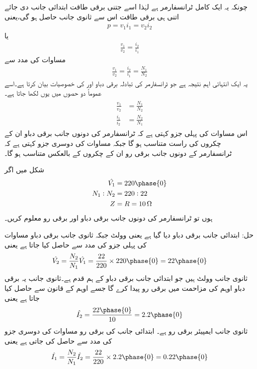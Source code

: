 چونکہ یہ ایک کامل ٹرانسفارمر ہے لہٰذا اسے جتنی برقی طاقت ابتدائی جانب  دی جائے اتنی ہی برقی طاقت اس سے ثانوی جانب حاصل ہو گی،یعنی
\begin{align}
p=v_1 i_1 = v_2 i_2
\end{align}
یا
\begin{align}
\frac{v_1}{v_2}=\frac{i_2}{i_1}
\end{align}
مساوات   کی مدد سے
\begin{align}
\frac{v_1}{v_2}=\frac{i_2}{i_1}=\frac{N_1}{N_2}
\end{align}
یہ ایک انتہائی اہم نتیجہ ہے جو ٹرانسفارمر کی تبادلہ برقی دباو اور   کی خصوصیات بیان کرتا ہے۔اسے عموماً دو حصوں میں یوں لکھا جاتا ہے۔
\begin{gather}
\begin{aligned}\label{مساوات_ٹرانسفارمر_تبادلہ_دباو_رو}
\frac{v_1}{v_2}&=\frac{N_1}{N_2}\\
\frac{i_1}{i_2}&=\frac{N_2}{N_1}
\end{aligned}
\end{gather}
اس مساوات کی پہلی جزو کہتی ہے کہ ٹرانسفارمر کی دونوں جانب برقی دباو  ان کے چکروں کی راست متناسب  ہو گا جبکہ مساوات کی دوسری جزو کہتی ہے کہ ٹرانسفارمر کے دونوں جانب برقی رو ان کے چکروں کے بالعکس متناسب ہو گا۔

	شکل    میں اگر
\begin{align*}
\hat{V_1}&=220 \phase{0}\\
N_1:N_2&=220:22\\
Z&=R=\SI{10}{\ohm}
\end{align*}
ہوں تو ٹرانسفارمر کی دونوں جانب برقی دباو اور برقی رو معلوم کریں۔

حل:
ابتدائی جانب برقی دباو دیا گیا ہے یعنی  وولٹ جبکہ ثانوی جانب برقی دباو مساوات  کی پہلی جزو کی مدد سے حاصل کیا جاتا ہے یعنی
\begin{align*}
\hat{V_2}=\frac{N_2}{N_1} \hat{V_1}=\frac{22}{220} \times 220\phase {0}=22\phase{0}
\end{align*}
ثانوی جانب  وولٹ ہیں جو ابتدائی جانب برقی دباو کے ہم قدم ہے۔ثانوی جانب یہ برقی دباو  اوہم کی مزاحمت میں برقی رو پیدا کرے گا جسے اوہم کے قانون سے حاصل کیا جاتا ہے یعنی
\begin{align*}
\hat{I_2}=\frac{22 \phase {0}}{10}=2.2\phase {0}
\end{align*}
ثانوی جانب  ایمپیئر برقی رو ہے۔ ابتدائی جانب کی برقی رو مساوات  کی دوسری جزو کی مدد سے حاصل کی جاتی ہے یعنی
\begin{align*}
\hat{I_1}=\frac{N_2}{N_1} \hat{I_2}=\frac{22}{220} \times 2.2\phase{0}=0.22\phase{0}
\end{align*}

